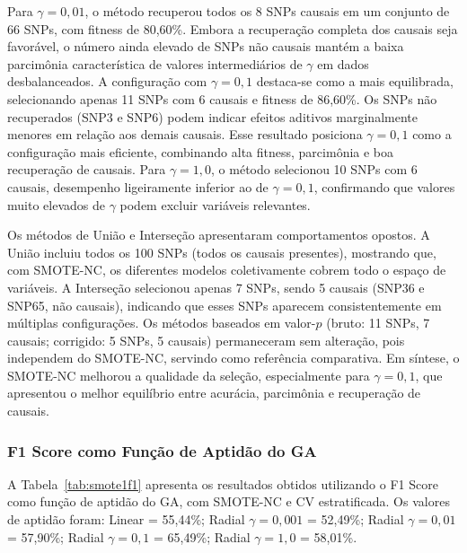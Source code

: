 \documentclass[12pt,a4paper]{article}
\newcommand{\novo}[1]{\textcolor{corNova}{#1}}
\begin{document}
\novo{Para $\gamma = 0{,}01$, o método recuperou todos os 8 SNPs causais em um conjunto de 66 SNPs, com fitness de 80,60\%. Embora a recuperação completa dos causais seja favorável, o número ainda elevado de SNPs não causais mantém a baixa parcimônia característica de valores intermediários de $\gamma$ em dados desbalanceados. A configuração com $\gamma = 0{,}1$ destaca-se como a mais equilibrada, selecionando apenas 11 SNPs com 6 causais e fitness de 86,60\%. Os SNPs não recuperados (SNP3 e SNP6) podem indicar efeitos aditivos marginalmente menores em relação aos demais causais. Esse resultado posiciona $\gamma = 0{,}1$ como a configuração mais eficiente, combinando alta fitness, parcimônia e boa recuperação de causais. Para $\gamma = 1{,}0$, o método selecionou 10 SNPs com 6 causais, desempenho ligeiramente inferior ao de $\gamma = 0{,}1$, confirmando que valores muito elevados de $\gamma$ podem excluir variáveis relevantes.}

\novo{Os métodos de União e Interseção apresentaram comportamentos opostos. A União incluiu todos os 100 SNPs (todos os causais presentes), mostrando que, com SMOTE-NC, os diferentes modelos coletivamente cobrem todo o espaço de variáveis. A Interseção selecionou apenas 7 SNPs, sendo 5 causais (SNP36 e SNP65, não causais), indicando que esses SNPs aparecem consistentemente em múltiplas configurações. Os métodos baseados em valor-$p$ (bruto: 11 SNPs, 7 causais; corrigido: 5 SNPs, 5 causais) permaneceram sem alteração, pois independem do SMOTE-NC, servindo como referência comparativa. Em síntese, o SMOTE-NC melhorou a qualidade da seleção, especialmente para $\gamma = 0{,}1$, que apresentou o melhor equilíbrio entre acurácia, parcimônia e recuperação de causais.}

\subsubsection{\novo{F1 Score como Função de Aptidão do GA}}

\novo{A Tabela~\ref{tab:smote1f1} apresenta os resultados obtidos utilizando o F1 Score como função de aptidão do GA, com SMOTE-NC e CV estratificada. Os valores de aptidão foram: Linear = 55,44\%; Radial $\gamma{=}0{,}001$ = 52,49\%; Radial $\gamma{=}0{,}01$ = 57,90\%; Radial $\gamma{=}0{,}1$ = 65,49\%; Radial $\gamma{=}1{,}0$ = 58,01\%.}
\end{document}
